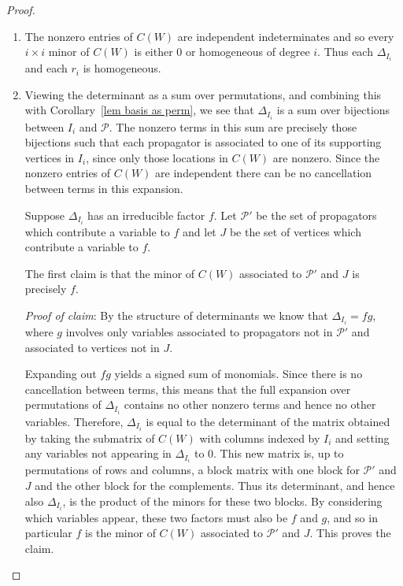 \documentclass[11pt]{article}
\theoremstyle{remark}
\theoremstyle{definition}
\begin{document}
\begin{proof}
\begin{enumerate}
    \item The nonzero entries of $C(W)$ are independent indeterminates and so every $i\times i$ minor of $C(W)$ is either $0$ or homogeneous of degree $i$.  Thus each $\Delta_{I_i}$ and each $r_i$ is homogeneous.  %
    \item Viewing the determinant as a sum over permutations, and combining this with Corollary~\ref{lem basis as perm}, we see that $\Delta_{I_i}$ is a sum over bijections between $I_i$ and $\mathcal{P}$.  The nonzero terms in this sum are precisely those bijections such that each propagator is associated to one of its supporting vertices in $I_i$, since only those locations in $C(W)$ are nonzero.  Since the nonzero entries of $C(W)$ are independent there can be no cancellation between terms in this expansion. 

Suppose $\Delta_{I_i}$ has an irreducible factor $f$.  Let $\mathcal{P}'$ be the set of propagators which contribute a variable to $f$ and let $J$ be the set of vertices which contribute a variable to $f$.

The first claim is that the minor of $C(W)$ associated to $\mathcal{P}'$ and $J$ is precisely $f$.

{\em Proof of claim}: By the structure of determinants we know that $\Delta_{I_i} = fg$, where $g$ involves only variables associated to propagators not in $\mathcal{P}'$ and associated to vertices not in $J$.

Expanding out $fg$ yields a signed sum of monomials. Since there is no cancellation between terms, this means that the full expansion over permutations of $\Delta_{I_i}$ contains no other nonzero terms and hence no other variables.  Therefore, $\Delta_{I_i}$ is equal to the determinant of the matrix obtained by taking the submatrix of $C(W)$ with columns indexed by $I_i$ and setting any variables not appearing in $\Delta_{I_i}$ to $0$.  This new matrix is, up to permutations of rows and columns, a block matrix with one block for $\mathcal{P}'$ and $J$ and the other block for the complements.  Thus its determinant, and hence also $\Delta_{I_i}$, is the product of the minors for these two blocks.  By considering which variables appear, these two factors must also be $f$ and $g$, and so in particular $f$ is the minor of $C(W)$ associated to $\mathcal{P}'$ and $J$.  This proves the claim.


\end{enumerate}
\end{proof}
\end{document}

